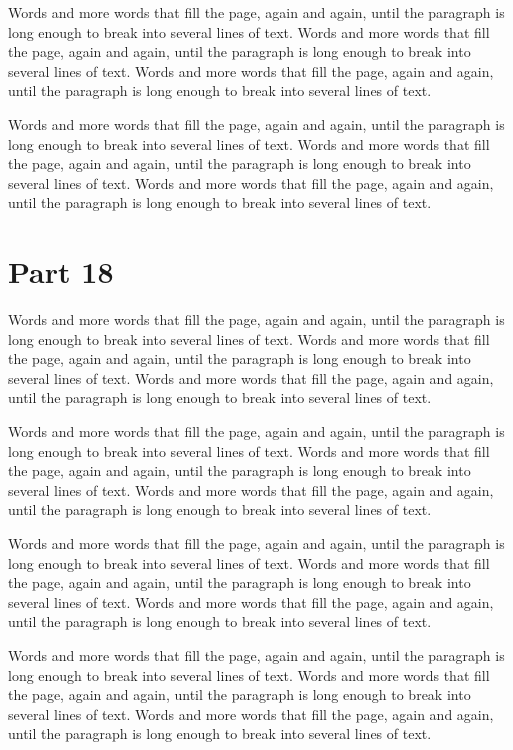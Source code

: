 \documentclass{article}
\begin{document}
Words and more words that fill the page, again and again, until the paragraph is long enough to break into several lines of text. Words and more words that fill the page, again and again, until the paragraph is long enough to break into several lines of text. Words and more words that fill the page, again and again, until the paragraph is long enough to break into several lines of text. 

Words and more words that fill the page, again and again, until the paragraph is long enough to break into several lines of text. Words and more words that fill the page, again and again, until the paragraph is long enough to break into several lines of text. Words and more words that fill the page, again and again, until the paragraph is long enough to break into several lines of text. 

\section{Part 18}
Words and more words that fill the page, again and again, until the paragraph is long enough to break into several lines of text. Words and more words that fill the page, again and again, until the paragraph is long enough to break into several lines of text. Words and more words that fill the page, again and again, until the paragraph is long enough to break into several lines of text. 

Words and more words that fill the page, again and again, until the paragraph is long enough to break into several lines of text. Words and more words that fill the page, again and again, until the paragraph is long enough to break into several lines of text. Words and more words that fill the page, again and again, until the paragraph is long enough to break into several lines of text. 

Words and more words that fill the page, again and again, until the paragraph is long enough to break into several lines of text. Words and more words that fill the page, again and again, until the paragraph is long enough to break into several lines of text. Words and more words that fill the page, again and again, until the paragraph is long enough to break into several lines of text. 

Words and more words that fill the page, again and again, until the paragraph is long enough to break into several lines of text. Words and more words that fill the page, again and again, until the paragraph is long enough to break into several lines of text. Words and more words that fill the page, again and again, until the paragraph is long enough to break into several lines of text. 
\end{document}

